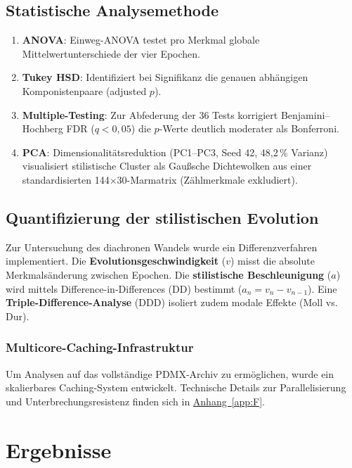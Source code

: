 \documentclass[10pt,a4paper]{article}
\theoremstyle{definition}
\begin{document}
\subsection{Statistische Analysemethode}\label{sec:stats}
\begin{enumerate}
    \item \textbf{ANOVA}: Einweg-ANOVA testet pro Merkmal globale Mittelwertunterschiede der vier Epochen.
    \item \textbf{Tukey HSD}: Identifiziert bei Signifikanz die genauen abhängigen Komponistenpaare (adjusted $p$).
    \item \textbf{Multiple-Testing}: Zur Abfederung der 36 Tests korrigiert Benjamini--Hochberg FDR ($q<0{,}05$) die $p$-Werte deutlich moderater als Bonferroni.
    \item \textbf{PCA}: Dimensionalitätsreduktion (PC1--PC3, Seed 42, 48{,}2\,\% Varianz) visualisiert stilistische Cluster als Gaußsche Dichtewolken aus einer standardisierten 144×30-Marmatrix (Zählmerkmale exkludiert).
\end{enumerate}

\subsection{Quantifizierung der stilistischen Evolution}\label{sec:evolution}
Zur Untersuchung des diachronen Wandels wurde ein Differenzverfahren implementiert. Die \textbf{Evolutionsgeschwindigkeit} ($v$) misst die absolute Merkmalsänderung zwischen Epochen. Die \textbf{stilistische Beschleunigung} ($a$) wird mittels Difference-in-Differences (DD) bestimmt ($a_n = v_n - v_{n-1}$). Eine \textbf{Triple-Difference-Analyse} (DDD) isoliert zudem modale Effekte (Moll vs. Dur).

\subsubsection{Multicore-Caching-Infrastruktur}
Um Analysen auf das vollständige PDMX-Archiv zu ermöglichen, wurde ein skalierbares Caching-System entwickelt. Technische Details zur Parallelisierung und Unterbrechungsresistenz finden sich in \hyperref[app:F]{Anhang~\ref*{app:F}}.


\section{Ergebnisse}
\end{document}
